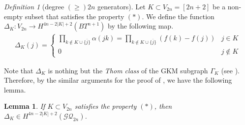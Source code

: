 \documentclass[12pt]{amsart}
\newtheorem{lemma}[theorem]{Lemma}
\theoremstyle{remark}
\newtheorem{definition}{Definition}[section]
\numberwithin{equation}{section}
\begin{document}
\begin{definition}[degree $(\ge )2n$ generators]
\label{higher_deg_generators}
Let $K\subset V_{2n}=[2n+2]$ be a non-empty subset that satisfies the property $(\ast)$.
We define the function $\Delta_{K}:V_{2n}\to H^{4n-2|K|+2}(BT^{n+1})$ by the following map.
\begin{align}
\label{higher-generator}
\Delta_{K}(j)=\left\{
\begin{array}{ll}
{\displaystyle \prod_{k\not\in K\cup \{\overline{j}\}}\alpha(jk)=\prod_{k\not\in K\cup \{\overline{j}\}}(f(k)-f(j))} & j\in K \\
0 & j\not\in K
\end{array}
\right.
\end{align}
\end{definition}
Note that $\Delta_{K}$ is nothing but the {\it Thom class} of the GKM subgraph $\Gamma_{K}$ (see \cite[Section 4]{MMP}). %
Therefore, by the similar arguments for the proof of \cite[Lemma 4.1]{MMP}, we have the following lemma.
\begin{lemma}  
If $K\subset V_{2n}$ satisfies the property $(\ast)$, then  
$\Delta_{K}\in H^{4n-2|K|+2}(\mathcal{GQ}_{2n})$.
\end{lemma}
\end{document}
